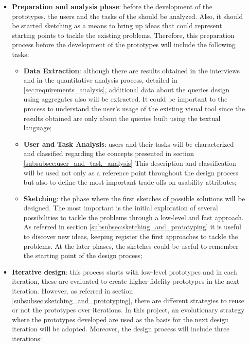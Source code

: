 \begin{itemize}
    \item \textbf{Preparation and analysis phase}: before the development of the prototypes, the users and the tasks of the should be analyzed. Also, it should be started sketching as a means to bring up ideas that could represent starting points to tackle the existing problems. Therefore, this preparation process before the development of the prototypes will include the following tasks:
    \begin{itemize}
        \item \textbf{Data Extraction}: although there are results obtained in the interviews and in the quantitative analysis process, detailed in \ref{sec:requirements_analysis}, additional data about the queries design using aggregates also will be extracted. It could be important to the process to understand the user's usage of the existing visual tool since the results obtained are only about the queries built using the textual language;
        \item \textbf{User and Task Analysis}: users and their tasks will be characterized and classified regarding the concepts presented in section \ref{subsubsec:user_and_task_analysis} This description and classification will be used not only as a reference point throughout the design process but also to define the most important trade-offs on usability attributes;
        \item \textbf{Sketching}: the phase where the first sketches of possible solutions will be designed. The most important is the initial exploration of several possibilities to tackle the problems through a low-level and fast approach. As referred in section \ref{subsubsec:sketching_and_prototyping} it is useful to discover new ideas, keeping register the first approaches to tackle the problems. At the later phases, the sketches could be useful to remember the starting point of the design process;
    \end{itemize}
    \item \textbf{Iterative design}: this process starts with low-level prototypes and in each iteration, these are evaluated to create higher fidelity prototypes in the next iteration. However, as referred in section \ref{subsubsec:sketching_and_prototyping}, there are different strategies to reuse or not the prototypes over iterations. In this project, an evolutionary strategy where the prototypes developed are used as the basis for the next design iteration will be adopted. Moreover, the design process will include three iterations:

\end{itemize}
